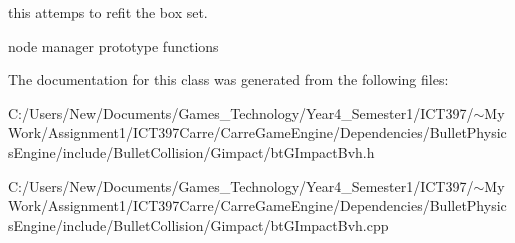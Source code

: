 this attemps to refit the box set. 

node manager prototype functions 

The documentation for this class was generated from the following files:\begin{CompactItemize}
\item 
C:/Users/New/Documents/Games\_\-Technology/Year4\_\-Semester1/ICT397/$\sim$My Work/Assignment1/ICT397Carre/CarreGameEngine/Dependencies/BulletPhysicsEngine/include/BulletCollision/Gimpact/btGImpactBvh.h\item 
C:/Users/New/Documents/Games\_\-Technology/Year4\_\-Semester1/ICT397/$\sim$My Work/Assignment1/ICT397Carre/CarreGameEngine/Dependencies/BulletPhysicsEngine/include/BulletCollision/Gimpact/btGImpactBvh.cpp\end{CompactItemize}
